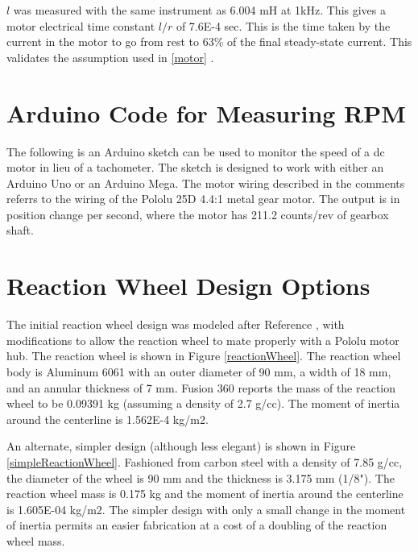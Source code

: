 \documentclass[12pt,letterpaper]{article}
\begin{document}
\begin{appendices}
$l$ was 
measured with the same instrument as 6.004 mH at 1kHz.  This gives a motor electrical time constant $l/r$ of 7.6E-4 sec.  This is the time taken by the current in the motor to go from rest to 63\% of the final steady-state current.  This
validates the assumption used in  \eqref{motor} .\\



\section{Arduino Code for Measuring RPM}

The following is an Arduino sketch can be used to monitor the speed of a dc motor in lieu of a tachometer.  The sketch is designed
to work with either an Arduino Uno or an Arduino Mega. The motor wiring described in the comments
referrs to the wiring of the Pololu 25D 4.4:1 metal gear motor.  The output is in position change 
per second, where the motor has 211.2 counts/rev of gearbox shaft. \\



\section{Reaction Wheel Design Options}

The initial reaction wheel design was modeled after Reference \cite{hackaday}, with modifications to allow the reaction wheel
to mate properly with a Pololu motor hub.  The reaction wheel is shown in Figure \ref{reactionWheel}.
The reaction wheel body is Aluminum 6061 with an outer diameter of 90 mm, a width of 18 mm, and an annular thickness of 7 mm. 
Fusion 360 reports the mass of the reaction wheel to be 0.09391 kg (assuming a density of 2.7 g/cc).
The moment of inertia around the centerline is 1.562E-4 kg/m2.

An alternate, simpler design (although less elegant) is shown in Figure \ref{simpleReactionWheel}.
Fashioned from carbon steel with a density of  7.85 g/cc, the diameter of the wheel is 90 mm and the
thickness is 3.175 mm (1/8").  The reaction wheel mass is 0.175 kg and the moment of inertia 
around the centerline is 1.605E-04 kg/m2.  The simpler design with only a small change in the moment
of inertia permits an easier fabrication at a cost of a doubling of the reaction wheel mass.





\end{appendices}
\end{document}
